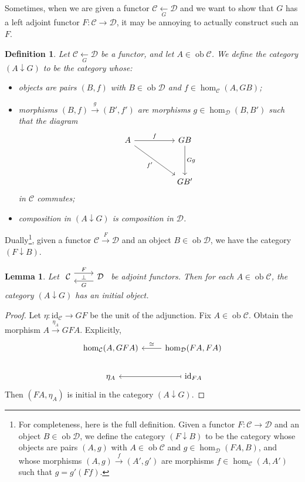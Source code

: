 \documentclass[a4paper,11pt]{article}
\theoremstyle{break_italics}
\newtheorem*{lemma*}{Lemma}
\newtheorem*{definition*}{Definition}
\theoremstyle{break_upright}
\theoremstyle{remark}
\newcommand{\id}{\mathrm{id}}
\newcommand{\ob}{\operatorname{ob}}
\newcommand{\C}{\mathcal{C}}
\newcommand{\D}{\mathcal{D}}
\begin{document}
Sometimes, when we are given a functor $\C \xleftarrow[G]{} \D$ and we want to show that $G$ has a left adjoint functor $F \colon \C \to \D$, it may be annoying to actually construct such an $F$.

\begin{definition*}
	Let $\C \xleftarrow[G]{} \D$ be a functor, and let $A \in \ob\C$. We define the category $(A \downarrow G)$ to be the category whose:
	\begin{itemize}
		\item objects are pairs $(B,f)$ with $B \in \ob\D$ and $f \in \hom_{\C}(A, GB)$;
		\item morphisms $(B,f) \overset{g}\rightarrow (B', f')$ are morphisms $g \in \hom_\D(B, B')$ such that the diagram
			\[
\begin{tikzcd}
A \arrow[rr, "f"] \arrow[rrdd, "f'"'] &  & GB \arrow[dd, "Gg"] \\
                                         &  &                       \\
                                         &  & GB'                
\end{tikzcd}
			\]
			in $\C$ commutes;
		\item composition in $(A \downarrow G)$ is composition in $\D$.
	\end{itemize}
\end{definition*}

Dually\footnote{For completeness, here is the full definition. Given a functor $F \colon \C \to \D$ and an object $B \in \ob\D$, we define the category $(F \downarrow B)$ to be the category whose objects are pairs $(A, g)$ with $A \in \ob\C$ and $g \in \hom_\D(FA, B)$, and whose morphisms $(A,g) \xrightarrow{f} (A', g')$ are morphisms $f \in \hom_\C(A, A')$ such that $g = g'(Ff)$.}, given a functor $\C \xrightarrow{F} \D$ and an object $B \in \ob\D$, we have the category $(F \downarrow B)$.

\begin{lemma*}
	Let $\begin{tikzcd}
	\C & \D
	\arrow["\bot"{description}, draw=none, from=1-1, to=1-2]
	\arrow["F", shift left=2, from=1-1, to=1-2]
	\arrow["G", shift left=2, from=1-2, to=1-1]
\end{tikzcd}$ be adjoint functors. Then for each $A \in \ob\C$, the category $(A \downarrow G)$ has an initial object.
\end{lemma*}
\begin{proof}
	Let $\eta \colon \id_\C \to GF$ be the unit of the adjunction. Fix $A \in \ob\C$. Obtain the morphism $A \xrightarrow{\eta_A} GFA$. Explicitly,
	\[
\begin{tikzcd}
{\hom_\C(A, GFA)} & {\hom_\D(FA,FA)} \arrow[l, "\cong"'] \\
\eta_A         & \id_{FA} \arrow[l, maps to]      
\end{tikzcd}
	\]
	Then $(FA, \eta_A)$ is initial in the category $(A \downarrow G)$.
\end{proof}
\end{document}
